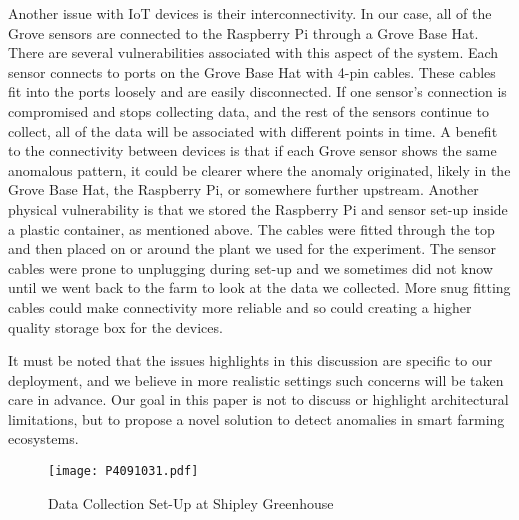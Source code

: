 Another issue with IoT devices is their interconnectivity. In our case, all of the Grove sensors are connected to the Raspberry Pi through a Grove Base Hat. There are several vulnerabilities associated with this aspect of the system. Each sensor connects to ports on the Grove Base Hat with 4-pin cables. These cables fit into the ports loosely and are easily disconnected. If one sensor's connection is compromised and stops collecting data, and the rest of the sensors continue to collect, all of the data will be associated with different points in time. A benefit to the connectivity between devices is that if each Grove sensor shows the same anomalous pattern, it could be clearer where the anomaly originated, likely in the Grove Base Hat, the Raspberry Pi, or somewhere further upstream. Another physical vulnerability is that we stored the Raspberry Pi and sensor set-up inside a plastic container, as mentioned above. The cables were fitted through the top and then placed on or around the plant we used for the experiment. The sensor cables were prone to unplugging during set-up and we sometimes did not know until we went back to the farm to look at the data we collected. More snug fitting cables could make connectivity more reliable and so could creating a higher quality storage box for the devices.  

It must be noted that the issues highlights in this discussion are specific to our deployment, and we believe in more realistic settings such concerns will be taken care in advance. Our goal in this paper is not to discuss or highlight architectural limitations, but to propose a novel solution to detect anomalies in smart farming ecosystems.

\begin{figure}[t!]
    \centering
    \texttt{[image: P4091031.pdf]}
    \caption{Data Collection Set-Up at Shipley Greenhouse}
    \label{fig:datacoll}
\end{figure}
